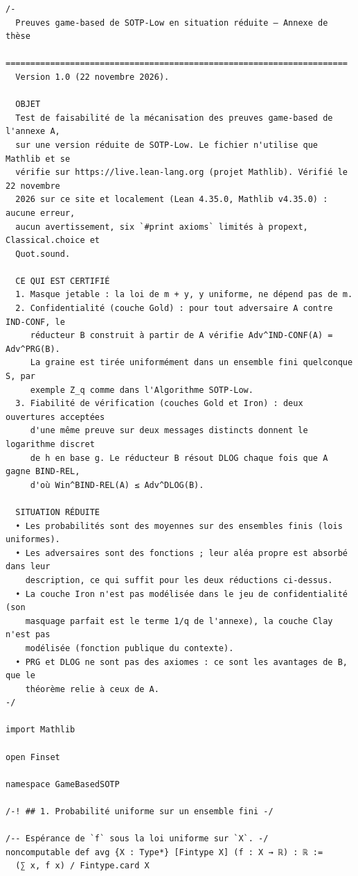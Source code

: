 \begin{lstlisting}[caption={M\'ecanisation r\'eduite des r\'eductions de SOTP-Low (version 1.0)}, label={lst:gamebased_lean}, language=Lean4]
/-
  Preuves game-based de SOTP-Low en situation réduite — Annexe de thèse
  =====================================================================
  Version 1.0 (22 novembre 2026).

  OBJET
  Test de faisabilité de la mécanisation des preuves game-based de l'annexe A,
  sur une version réduite de SOTP-Low. Le fichier n'utilise que Mathlib et se
  vérifie sur https://live.lean-lang.org (projet Mathlib). Vérifié le 22 novembre
  2026 sur ce site et localement (Lean 4.35.0, Mathlib v4.35.0) : aucune erreur,
  aucun avertissement, six `#print axioms` limités à propext, Classical.choice et
  Quot.sound.

  CE QUI EST CERTIFIÉ
  1. Masque jetable : la loi de m + y, y uniforme, ne dépend pas de m.
  2. Confidentialité (couche Gold) : pour tout adversaire A contre IND-CONF, le
     réducteur B construit à partir de A vérifie Adv^IND-CONF(A) = Adv^PRG(B).
     La graine est tirée uniformément dans un ensemble fini quelconque S, par
     exemple Z_q comme dans l'Algorithme SOTP-Low.
  3. Fiabilité de vérification (couches Gold et Iron) : deux ouvertures acceptées
     d'une même preuve sur deux messages distincts donnent le logarithme discret
     de h en base g. Le réducteur B résout DLOG chaque fois que A gagne BIND-REL,
     d'où Win^BIND-REL(A) ≤ Adv^DLOG(B).

  SITUATION RÉDUITE
  • Les probabilités sont des moyennes sur des ensembles finis (lois uniformes).
  • Les adversaires sont des fonctions ; leur aléa propre est absorbé dans leur
    description, ce qui suffit pour les deux réductions ci-dessus.
  • La couche Iron n'est pas modélisée dans le jeu de confidentialité (son
    masquage parfait est le terme 1/q de l'annexe), la couche Clay n'est pas
    modélisée (fonction publique du contexte).
  • PRG et DLOG ne sont pas des axiomes : ce sont les avantages de B, que le
    théorème relie à ceux de A.
-/

import Mathlib

open Finset

namespace GameBasedSOTP

/-! ## 1. Probabilité uniforme sur un ensemble fini -/

/-- Espérance de `f` sous la loi uniforme sur `X`. -/
noncomputable def avg {X : Type*} [Fintype X] (f : X → ℝ) : ℝ :=
  (∑ x, f x) / Fintype.card X


\end{lstlisting}

